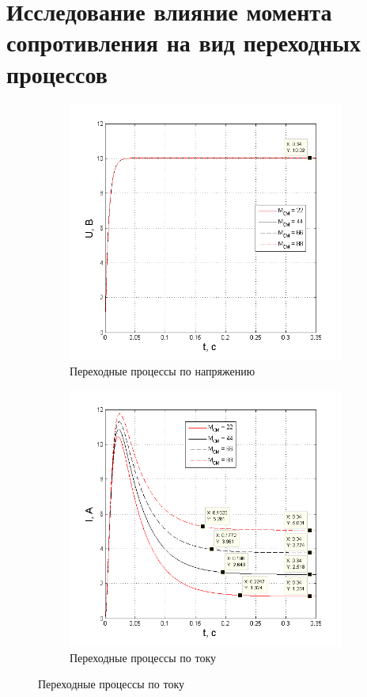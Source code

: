 \documentclass[fleqn, a4paper, 11pt, russian]{article}
\begin{document}
	\section{Исследование влияние момента сопротивления на вид переходных процессов}
	\begin{figure}[ht!]
		\centering
		\begin{subfigure}[b]{0.49\textwidth}
			\includegraphics[width = \textwidth]{MvarU}
			\caption{Переходные процессы по напряжению}
		\end{subfigure}
		\hfill
		\begin{subfigure}[b]{0.49\textwidth}
			\includegraphics[width = \textwidth]{MvarI}
			\caption{Переходные процессы по току}
		\end{subfigure}
	\end{figure}
\end{document}
